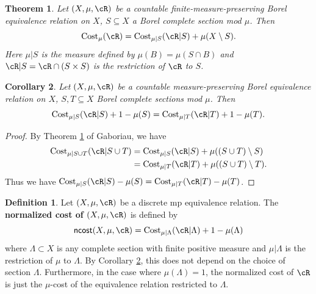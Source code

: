 \documentclass[12pt]{article}
\theoremstyle{plain}
\newtheorem{thm}{Theorem}[section]
\newtheorem{cor}[thm]{Corollary}
\theoremstyle{definition}
\newtheorem{defn}{Definition}
\theoremstyle{remark}
\newcommand\cost{{\operatorname{Cost}}}
\begin{document}
\begin{thm}\label{section}\cite{gaboriau-cost}
    Let $(X,\mu,\cR)$ be a countable finite-measure-preserving Borel equivalence relation on $X$, $S\subseteq X$ a Borel complete section mod $\mu$. 
    Then \[\cost_\mu(\cR) = \cost_{\mu|S}(\cR|S)+\mu(X\setminus S).\]
    Here $\mu|S$ is the measure defined by $\mu(B)=\mu(S\cap B)$ and $\cR|S = \cR \cap (S\times S)$ is the restriction of $\cR$ to $S$. 
\end{thm}

\begin{cor}\label{C:cost-section}
 Let $(X,\mu,\cR)$ be a countable measure-preserving Borel equivalence relation on $X$, $S,T\subseteq X$ Borel complete sections mod $\mu$. 
Then
$$\cost_{\mu|S}(\cR|{S})+1-\mu( S) = \cost_{\mu|T}(\cR|{T})+1-\mu(T).$$
\end{cor}

\begin{proof}
By Theorem \ref{section} of Gaboriau, we have
    \begin{align*}
        \cost_{\mu | S\cup T }(\cR|{S \cup T}) &= \cost_{\mu|S}(\cR|S)+ \mu((S \cup T) \setminus S) \\
        &= \cost_{\mu|T}(\cR|T)+ \mu((S\cup T) \setminus T).
    \end{align*}
Thus we have $\cost_{\mu|S}(\cR|S)-\mu( S) = \cost_{\mu|T}(\cR|T)-\mu(T)$.
\end{proof}

\begin{defn}
Let $(X,\mu,\cR)$ be a discrete mp equivalence relation. The\textbf{ normalized cost of $(X,\mu,\cR)$} is defined by 
$$\mathsf{ncost}(X,\mu,\cR) = \cost_{\mu|\Lambda}(\cR|\Lambda)+1-\mu(\Lambda)$$
where $\Lambda \subset X$ is any complete section with finite positive measure and $\mu|\Lambda$ is the restriction of $\mu$ to $\Lambda$. By Corollary \ref{C:cost-section}, this does not depend on the choice of section $\Lambda$. Furthermore, in the case where $\mu(\Lambda) = 1$, the normalized cost of $\cR$ is just the $\mu$-cost of the equivalence relation restricted to $\Lambda$. 
\end{defn}


\end{document}
